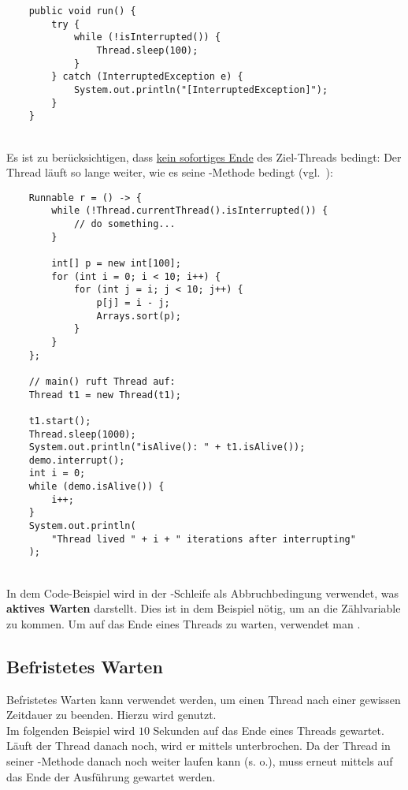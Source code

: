 \begin{verbatim}
    public void run() {
        try {
            while (!isInterrupted()) {
                Thread.sleep(100);
            }
        } catch (InterruptedException e) {
            System.out.println("[InterruptedException]");
        }
    }
\end{verbatim}\\

Es ist zu berücksichtigen, dass  \ul{kein sofortiges Ende} des Ziel-Threads bedingt: Der Thread läuft so lange weiter, wie es seine -Methode bedingt (vgl.~\cite[44 f.]{Oec22}):


\begin{verbatim}
    Runnable r = () -> {
        while (!Thread.currentThread().isInterrupted()) {
            // do something...
        }

        int[] p = new int[100];
        for (int i = 0; i < 10; i++) {
            for (int j = i; j < 10; j++) {
                p[j] = i - j;
                Arrays.sort(p);
            }
        }
    };

    // main() ruft Thread auf:
    Thread t1 = new Thread(t1);

    t1.start();
    Thread.sleep(1000);
    System.out.println("isAlive(): " + t1.isAlive());
    demo.interrupt();
    int i = 0;
    while (demo.isAlive()) {
        i++;
    }
    System.out.println(
        "Thread lived " + i + " iterations after interrupting"
    );
\end{verbatim}\\

In dem Code-Beispiel wird in der -Schleife  als Abbruchbedingung verwendet, was \textbf{aktives Warten} darstellt.
Dies ist in dem Beispiel nötig, um an die Zählvariable zu kommen.
Um auf das Ende eines Threads zu warten, verwendet man .

\subsection*{Befristetes Warten}

Befristetes Warten kann verwendet werden, um einen Thread nach einer gewissen Zeitdauer zu beenden.
Hierzu wird  genutzt.\\
Im folgenden Beispiel wird $10$ Sekunden auf das Ende eines Threads gewartet.
Läuft der Thread danach noch, wird er mittels  unterbrochen.
Da der Thread in seiner  -Methode danach noch weiter laufen kann (s. o.), muss erneut mittels  auf
das Ende der Ausführung gewartet werden.

